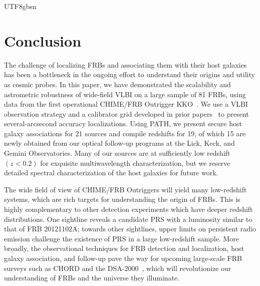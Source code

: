 \documentclass[twocolumn,linenumbers]{aastex631}
\begin{document}
\begin{CJK*}{UTF8}{gbsn}
\section{Conclusion}
The challenge of localizing FRBs and associating them with their host galaxies has been a bottleneck in the ongoing effort to understand their origins and utility as cosmic probes. In this paper, we have demonstrated the scalability and astrometric robustness of wide-field VLBI on a large sample of 81 FRBs, using data from the first operational CHIME/FRB Outrigger KKO~\citep{lanman2024chime}. We use a VLBI observation strategy and a calibrator grid developed in prior papers~\citep{leung2021synoptic,andrew2024vlbi} to present several-arcsecond accuracy localizations. Using PATH, we present secure host galaxy associations for 21 sources and compile redshifts for 19, of which 15 are newly obtained from our optical follow-up programs at the Lick, Keck, and Gemini Observatories. Many of our sources are at sufficiently low redshift $(z < 0.2)$ for exquisite multiwavelength characterization, but we reserve detailed spectral characterization of the host galaxies for future work.

The wide field of view of CHIME/FRB Outriggers will yield many low-redshift systems, which are rich targets for understanding the origin of FRBs. This is highly complementary to other detection experiments which have deeper redshift distributions. %
One sightline reveals a candidate PRS with a luminosity similar to that of FRB 20121102A; towards other sightlines, upper limits on persistent radio emission challenge the existence of PRS in a large low-redshift sample. More broadly, the observational techniques for FRB detection and localization, host galaxy association, and follow-up pave the way for upcoming large-scale FRB surveys such as CHORD and the DSA-2000~\citep{vanderlinde2019canadian,hallinan2019dsa}, which will revolutionize our understanding of FRBs and the universe they illuminate.

\begin{table} 
\centering
\addtolength{\leftskip}{-6cm}

\addtolength{\rightskip}{-4cm}
\label{tab:gold_sample}
\end{table}


\end{CJK*}
\end{document}
